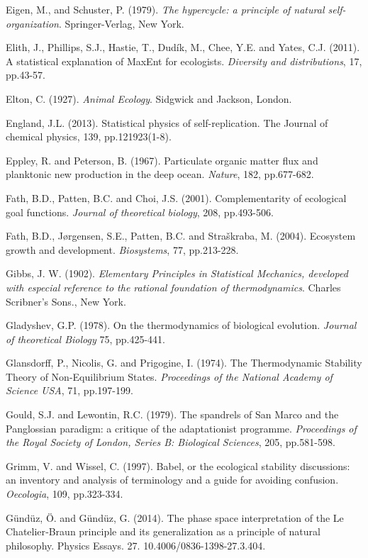 \documentclass[11pt,letterpaper,]{paper}
\begin{document}
Eigen, M., and Schuster, P. (1979). \emph{The hypercycle: a principle of
natural self-organization}. Springer-Verlag, New York.

Elith, J., Phillips, S.J., Hastie, T., Dudík, M., Chee, Y.E. and Yates,
C.J. (2011). A statistical explanation of MaxEnt for ecologists.
\emph{Diversity and distributions}, 17, pp.43-57.

Elton, C. (1927). \emph{Animal Ecology}. Sidgwick and Jackson, London.

England, J.L. (2013). Statistical physics of self-replication. The
Journal of chemical physics, 139, pp.121923(1-8).

Eppley, R. and Peterson, B. (1967). Particulate organic matter flux and
planktonic new production in the deep ocean. \emph{Nature}, 182,
pp.677-682.

Fath, B.D., Patten, B.C. and Choi, J.S. (2001). Complementarity of
ecological goal functions. \emph{Journal of theoretical biology}, 208,
pp.493-506.

Fath, B.D., Jørgensen, S.E., Patten, B.C. and Straškraba, M. (2004).
Ecosystem growth and development. \emph{Biosystems}, 77, pp.213-228.

Gibbs, J. W. (1902). \emph{Elementary Principles in Statistical
Mechanics, developed with especial reference to the rational foundation
of thermodynamics}. Charles Scribner's Sons., New York.

Gladyshev, G.P. (1978). On the thermodynamics of biological evolution.
\emph{Journal of theoretical Biology} 75, pp.425-441.

Glansdorff, P., Nicolis, G. and Prigogine, I. (1974). The Thermodynamic
Stability Theory of Non-Equilibrium States. \emph{Proceedings of the
National Academy of Science USA}, 71, pp.197-199.

Gould, S.J. and Lewontin, R.C. (1979). The spandrels of San Marco and
the Panglossian paradigm: a critique of the adaptationist programme.
\emph{Proceedings of the Royal Society of London, Series B: Biological
Sciences}, 205, pp.581-598.

Grimm, V. and Wissel, C. (1997). Babel, or the ecological stability
discussions: an inventory and analysis of terminology and a guide for
avoiding confusion. \emph{Oecologia}, 109, pp.323-334.

Gündüz, Ö. and Gündüz, G. (2014). The phase space interpretation of the
Le Chatelier‐Braun principle and its generalization as a principle of
natural philosophy. Physics Essays. 27. 10.4006/0836-1398-27.3.404.
\end{document}
